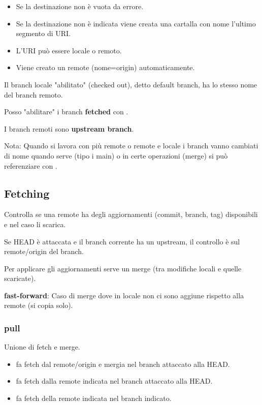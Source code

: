 
\begin{itemize}
	\item Se la destinazione non è vuota da errore.
	\item Se la destinazione non è indicata viene creata una cartalla con nome l'ultimo segmento di URI.
	\item L'URI può essere locale o remoto.
	\item Viene creato un remote (nome=origin) automaticamente.
\end{itemize}

Il branch locale "abilitato" (checked out), detto default branch, ha lo stesso nome del branch remoto.

\medskip

Posso "abilitare" i branch \textbf{fetched} con .

\medskip

I branch remoti sono \textbf{upstream branch}.

\bigskip

Nota: Quando si lavora con più remote o remote e locale i branch vanno cambiati di nome quando serve (tipo i main) o in certe operazioni (merge) si può referenziare con .

\subsection{Fetching}
Controlla se una remote ha degli aggiornamenti (commit, branch, tag) disponibili e nel caso li scarica.


Se HEAD è attaccata e il branch corrente ha un upstream, il controllo è sul remote/origin del branch.


Per applicare gli aggiornamenti serve un merge (tra modifiche locali e quelle scaricate).

\textbf{fast-forward}: Caso di merge dove in locale non ci sono aggiune rispetto alla remote (si copia solo).

\subsubsection{pull}
Unione di fetch e merge.
\begin{itemize}
	\item {} fa fetch dal remote/origin e mergia nel branch attaccato alla HEAD.
	\item {} fa fetch dalla remote indicata nel branch attaccato alla HEAD.
	\item {} fa fetch della remote indicata nel branch indicato.
\end{itemize}


